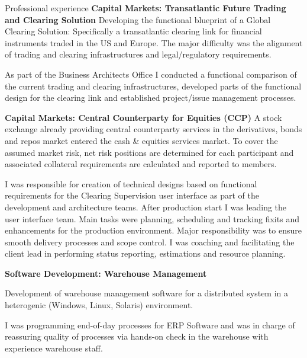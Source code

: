 \begin{rubric}{Professional experience}
\entry*[07/2003 - 10/2003] \textbf{Capital Markets: Transatlantic Future Trading and Clearing Solution}\newline
{} 
Developing the functional blueprint of a Global Clearing Solution: Specifically a transatlantic clearing link for financial instruments traded in the US and Europe. The major difficulty was the alignment of trading and clearing infrastructures and legal/regulatory requirements.

As part of the Business Architects Office I conducted a functional comparison of the current trading and clearing infrastructures, developed parts of the functional design for the clearing link and established project/issue management processes.

\entry*[12/2001 - 06/2003] \textbf{Capital Markets: Central Counterparty for Equities (CCP)}\newline
{} 
A stock exchange already providing central counterparty services in the derivatives, bonds and repos market entered the cash \& equities services market. To cover the assumed market risk, net risk positions are determined for each participant and associated collateral requirements are calculated and reported to members. 

I was responsible for creation of technical designs based on functional requirements for the Clearing Supervision user interface as part of the development and architecture teams.
After production start I was leading the user interface team. Main tasks were planning, scheduling and tracking fixits and enhancements for the production environment. Major responsibility was to ensure smooth delivery processes and scope control. I was coaching and facilitating the client lead in performing status reporting,
estimations and resource planning.


\entry*[01/2001 - 10/2001] \textbf{Software Development: Warehouse Management}\newline

Development of warehouse management software for a distributed system in a heterogenic (Windows, Linux, Solaris) environment.

I was programming end-of-day processes for ERP Software and was in charge of reassuring quality of processes via hands-on check in the warehouse with experience warehouse staff.



\end{rubric}
